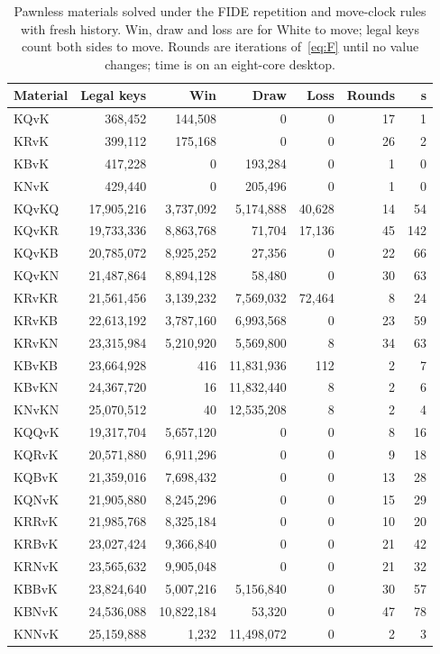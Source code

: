 \begin{table}[t]\centering\small
\caption{Pawnless materials solved under the FIDE repetition and move-clock rules with fresh history. Win, draw and loss are for White to move; legal keys count both sides to move. Rounds are iterations of~\eqref{eq:F} until no value changes; time is on an eight-core desktop.}
\label{tab:chess}
\begin{tabular}{@{}lrrrrrr@{}}\toprule
Material & Legal keys & Win & Draw & Loss & Rounds & s\\ \midrule
KQvK & 368{,}452 & 144{,}508 & 0 & 0 & 17 & 1\\
KRvK & 399{,}112 & 175{,}168 & 0 & 0 & 26 & 2\\
KBvK & 417{,}228 & 0 & 193{,}284 & 0 & 1 & 0\\
KNvK & 429{,}440 & 0 & 205{,}496 & 0 & 1 & 0\\
KQvKQ & 17{,}905{,}216 & 3{,}737{,}092 & 5{,}174{,}888 & 40{,}628 & 14 & 54\\
KQvKR & 19{,}733{,}336 & 8{,}863{,}768 & 71{,}704 & 17{,}136 & 45 & 142\\
KQvKB & 20{,}785{,}072 & 8{,}925{,}252 & 27{,}356 & 0 & 22 & 66\\
KQvKN & 21{,}487{,}864 & 8{,}894{,}128 & 58{,}480 & 0 & 30 & 63\\
KRvKR & 21{,}561{,}456 & 3{,}139{,}232 & 7{,}569{,}032 & 72{,}464 & 8 & 24\\
KRvKB & 22{,}613{,}192 & 3{,}787{,}160 & 6{,}993{,}568 & 0 & 23 & 59\\
KRvKN & 23{,}315{,}984 & 5{,}210{,}920 & 5{,}569{,}800 & 8 & 34 & 63\\
KBvKB & 23{,}664{,}928 & 416 & 11{,}831{,}936 & 112 & 2 & 7\\
KBvKN & 24{,}367{,}720 & 16 & 11{,}832{,}440 & 8 & 2 & 6\\
KNvKN & 25{,}070{,}512 & 40 & 12{,}535{,}208 & 8 & 2 & 4\\
KQQvK & 19{,}317{,}704 & 5{,}657{,}120 & 0 & 0 & 8 & 16\\
KQRvK & 20{,}571{,}880 & 6{,}911{,}296 & 0 & 0 & 9 & 18\\
KQBvK & 21{,}359{,}016 & 7{,}698{,}432 & 0 & 0 & 13 & 28\\
KQNvK & 21{,}905{,}880 & 8{,}245{,}296 & 0 & 0 & 15 & 29\\
KRRvK & 21{,}985{,}768 & 8{,}325{,}184 & 0 & 0 & 10 & 20\\
KRBvK & 23{,}027{,}424 & 9{,}366{,}840 & 0 & 0 & 21 & 42\\
KRNvK & 23{,}565{,}632 & 9{,}905{,}048 & 0 & 0 & 21 & 32\\
KBBvK & 23{,}824{,}640 & 5{,}007{,}216 & 5{,}156{,}840 & 0 & 30 & 57\\
KBNvK & 24{,}536{,}088 & 10{,}822{,}184 & 53{,}320 & 0 & 47 & 78\\
KNNvK & 25{,}159{,}888 & 1{,}232 & 11{,}498{,}072 & 0 & 2 & 3\\
\bottomrule
\end{tabular}
\end{table}